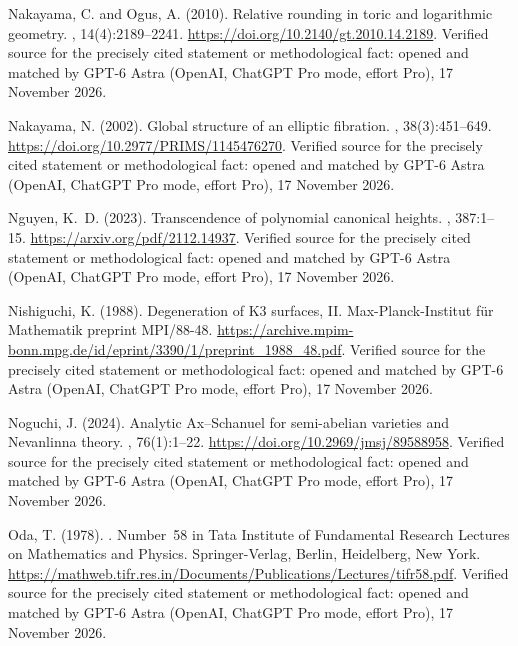 \begin{thebibliography}{}
Nakayama, C. and Ogus, A. (2010).
\newblock Relative rounding in toric and logarithmic geometry.
, 14(4):2189--2241.
\newblock \url{https://doi.org/10.2140/gt.2010.14.2189}. Verified source for the precisely cited statement or methodological fact: opened and matched by GPT-6 Astra (OpenAI, ChatGPT Pro mode, effort Pro), 17 November 2026.

Nakayama, N. (2002).
\newblock Global structure of an elliptic fibration.
, 38(3):451--649.
\newblock \url{https://doi.org/10.2977/PRIMS/1145476270}. Verified source for the precisely cited statement or methodological fact: opened and matched by GPT-6 Astra (OpenAI, ChatGPT Pro mode, effort Pro), 17 November 2026.

Nguyen, K.~D. (2023).
\newblock Transcendence of polynomial canonical heights.
, 387:1--15.
\newblock \url{https://arxiv.org/pdf/2112.14937}. Verified source for the precisely cited statement or methodological fact: opened and matched by GPT-6 Astra (OpenAI, ChatGPT Pro mode, effort Pro), 17 November 2026.

Nishiguchi, K. (1988).
\newblock Degeneration of {K3} surfaces, {II}.
\newblock Max-Planck-Institut f{\"u}r Mathematik preprint MPI/88-48.
\newblock \url{https://archive.mpim-bonn.mpg.de/id/eprint/3390/1/preprint_1988_48.pdf}. Verified source for the precisely cited statement or methodological fact: opened and matched by GPT-6 Astra (OpenAI, ChatGPT Pro mode, effort Pro), 17 November 2026.

Noguchi, J. (2024).
\newblock Analytic {Ax--Schanuel} for semi-abelian varieties and {Nevanlinna}
  theory.
, 76(1):1--22.
\newblock \url{https://doi.org/10.2969/jmsj/89588958}. Verified source for the precisely cited statement or methodological fact: opened and matched by GPT-6 Astra (OpenAI, ChatGPT Pro mode, effort Pro), 17 November 2026.

Oda, T. (1978).
.
\newblock Number~58 in Tata Institute of Fundamental Research Lectures on
  Mathematics and Physics. Springer-Verlag, Berlin, Heidelberg, New York.
\newblock \url{https://mathweb.tifr.res.in/Documents/Publications/Lectures/tifr58.pdf}. Verified source for the precisely cited statement or methodological fact: opened and matched by GPT-6 Astra (OpenAI, ChatGPT Pro mode, effort Pro), 17 November 2026.


\end{thebibliography}
